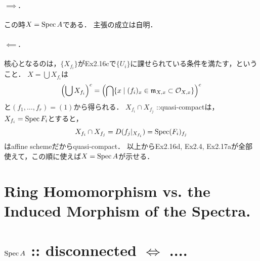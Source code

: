 \documentclass[a4paper]{jsarticle}
\newcommand{\shO}{\mathcal{O}}
\begin{document}
    \paragraph{$\implies$.}
    この時$X=\operatorname{Spec} A$である．
    主張の成立は自明．

    \paragraph{$\impliedby$.}
    核心となるのは，$\{X_{f_i}\}$がEx2.16cで$\{U_i\}$に課せられている条件を満たす，ということ．
    $X=\bigcup X_{f_i}$は
    \[ \left( \bigcup X_{f_i} \right)^c=\left( \bigcap \{x \mid (f_i)_x \in \I{m}_{X,x} \subset \shO_{X,x}\} \right)^c \]
    と$(f_1,\dots,f_r)=(1)$から得られる．
    $X_{f_i} \cap X_{f_j}$ ::quasi-compactは，$X_{f_i}=\operatorname{Spec} F_i$とすると，
    \[ X_{f_i} \cap X_{f_j}=D(f_j|_{X_{f_i}})=\operatorname{Spec} (F_i)_{f_j} \]はaffine schemeだからquasi-compact．
    以上からEx2.16d, Ex2.4, Ex2.17aが全部使えて，この順に使えば$X=\operatorname{Spec} A$が示せる．

\section{Ring Homomorphism vs. the Induced Morphism of the Spectra.} %

\section{$\operatorname{Spec} A$ :: disconnected $\iff$ ....} %
\end{document}
